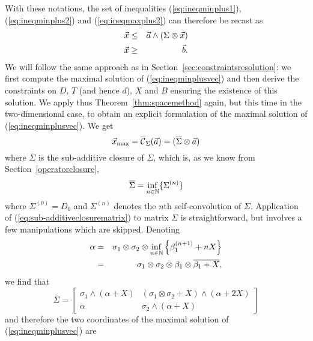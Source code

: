 With these notations, the set of inequalities (\ref{eq:ineqminplus1}), (\ref{eq:ineqminplus2}) and  (\ref{eq:ineqmaxplus2}) can therefore be recast as
\begin{eqnarray}
\mylabel{eq:ineqminplusvec}
\vec{x} & \leq & \vec{a} \wedge (\Sigma \otimes \vec{x}) \\
\mylabel{eq:ineqmaxplusvec}
\vec{x} & \geq & \vec{b}.
\end{eqnarray}
We will follow the same approach as in Section~\ref{sec:constraintsresolution}: we first compute the maximal solution of (\ref{eq:ineqminplusvec}) and then derive the constraints on $D$, $T$ (and hence $d$), $X$ and $B$ ensuring the existence of this solution. We apply thus Theorem~\ref{thm:spacemethod} again, but this time in the two-dimensional case, to obtain
an explicit formulation of the maximal solution of (\ref{eq:ineqminplusvec}). We get
\begin{equation}
\mylabel{eq:solutionineqgeneralminplusvec}
\vec{x}_{\max} = \overline{\calC}_{\Sigma} (\vec{a}) = (\overline{\Sigma} \otimes \vec{a})
\end{equation}
where $\overline{\Sigma}$ is the sub-additive closure of $\Sigma$, which is, as we know from Section~\ref{operatorclosure},
\begin{equation}
\mylabel{eq:sub-additiveclosurematrix}
\overline{\Sigma} = %
 \inf_{n \in \Nats}  \{ \Sigma^{(n)} \}
\end{equation}
where $\Sigma^{(0)} = D_0$ and $\Sigma^{(n)}$ denotes the $n$th self-convolution of $\Sigma$.
Application of (\ref{eq:sub-additiveclosurematrix}) to matrix $\Sigma$ is straightforward,
but involves a few manipulations which are skipped.
Denoting
\begin{eqnarray}
\mylabel{eq:alpha}
\alpha & = & \sigma_1 \otimes \sigma_2 \otimes \inf_{n \in \Nats} \left\{ \beta_1^{(n+1)} + nX \right\} \\
    & = &  \sigma_1 \otimes \sigma_2 \otimes \beta_1 \otimes \overline{ \beta_1 + X }, \nonumber
\end{eqnarray}
we find that
$$ \overline{\Sigma} = \left[ \begin{array}{cc}
    \!\! \sigma_1 \! \wedge \! (\alpha \! + X)   & (\sigma_1 \! \otimes \! \sigma_2 \! + \! X) \! \wedge \! (\alpha +2X)\!\!  \\
    \alpha  & \sigma_2 \wedge (\alpha + X)   \end{array} \right] $$
and therefore the two coordinates of the maximal solution of  (\ref{eq:ineqminplusvec}) are
